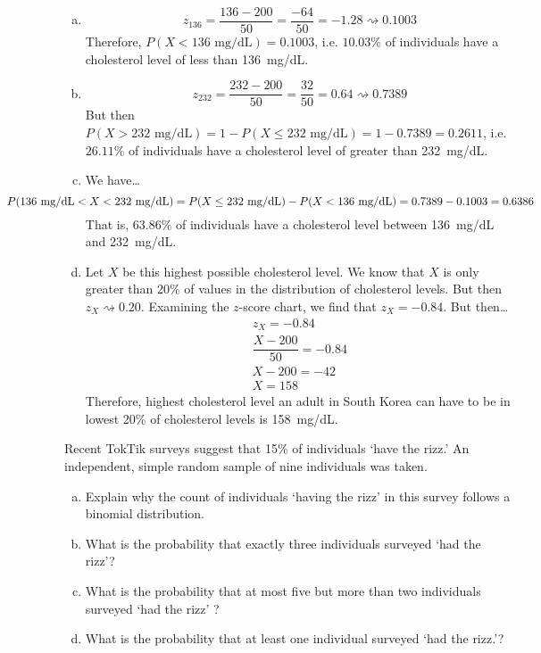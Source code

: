 \documentclass[12pt,letterpaper]{exam}
\newcommand{\squiggle}{\rightsquigarrow}
\begin{document}
\begin{questions}
\begin{enumerate}[(a)]
\item 
	\[
	z_{136}= \dfrac{136 - 200}{50}= \dfrac{-64}{50}= -1.28 \squiggle 0.1003
	\] 
Therefore, $P(X < 136 \text{ mg/dL})= 0.1003$, i.e. $10.03\%$ of individuals have a cholesterol level of less than 136~mg/dL. \pspace

\item 
	\[
	z_{232}= \dfrac{232 - 200}{50}= \dfrac{32}{50}= 0.64 \squiggle 0.7389
	\] 
But then $P(X > 232 \text{ mg/dL})= 1 - P(X \leq 232 \text{ mg/dL})= 1 - 0.7389= 0.2611$, i.e. $26.11\%$ of individuals have a cholesterol level of greater than 232~mg/dL. \pspace

\item We have\dots
	\[
	\hspace{-2.5cm} P(136 \text{ mg/dL} < X < 232 \text{ mg/dL})= P(X \leq 232 \text{ mg/dL}) - P(X < 136 \text{ mg/dL})= 0.7389 - 0.1003= 0.6386
	\]
That is, $63.86\%$ of individuals have a cholesterol level between 136~mg/dL and 232~mg/dL. \pspace

\item Let $X$ be this highest possible cholesterol level. We know that $X$ is only greater than 20\% of values in the distribution of cholesterol levels. But then $z_X \squiggle 0.20$. Examining the $z$-score chart, we find that $z_X= -0.84$. But then\dots
	\[
	\begin{gathered}
	z_X= -0.84 \\
	\dfrac{X - 200}{50}= -0.84 \\
	X - 200= -42 \\
	X= 158
	\end{gathered}
	\]
Therefore, highest cholesterol level an adult in South Korea can have to be in lowest 20\% of cholesterol levels is 158~mg/dL. 
\end{enumerate}



\newpage
\question[15] Recent TokTik surveys suggest that 15\% of individuals `have the rizz.' An independent, simple random sample of nine individuals was taken. 
        \begin{enumerate}[(a)]
        \item Explain why the count of individuals `having the rizz' in this survey follows a binomial distribution. 
        \item What is the probability that exactly three individuals surveyed `had the rizz'?
        \item What is the probability that at most five but more than two individuals surveyed `had the rizz' ?
        \item What is the probability that at least one individual surveyed `had the rizz.'?
        \end{enumerate} \pspace


\end{questions}
\end{document}
